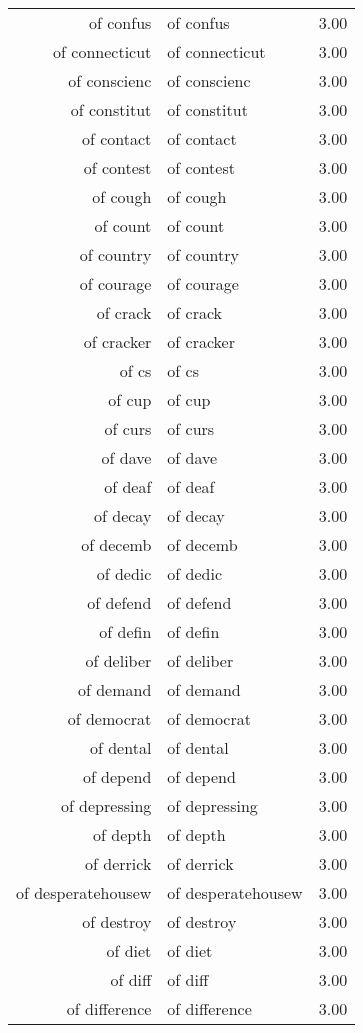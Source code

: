 \begin{table}[ht]
\begin{tabular}{rlr}
  of confus & of confus & 3.00 \\ 
  of connecticut & of connecticut & 3.00 \\ 
  of conscienc & of conscienc & 3.00 \\ 
  of constitut & of constitut & 3.00 \\ 
  of contact & of contact & 3.00 \\ 
  of contest & of contest & 3.00 \\ 
  of cough & of cough & 3.00 \\ 
  of count & of count & 3.00 \\ 
  of country & of country & 3.00 \\ 
  of courage & of courage & 3.00 \\ 
  of crack & of crack & 3.00 \\ 
  of cracker & of cracker & 3.00 \\ 
  of cs & of cs & 3.00 \\ 
  of cup & of cup & 3.00 \\ 
  of curs & of curs & 3.00 \\ 
  of dave & of dave & 3.00 \\ 
  of deaf & of deaf & 3.00 \\ 
  of decay & of decay & 3.00 \\ 
  of decemb & of decemb & 3.00 \\ 
  of dedic & of dedic & 3.00 \\ 
  of defend & of defend & 3.00 \\ 
  of defin & of defin & 3.00 \\ 
  of deliber & of deliber & 3.00 \\ 
  of demand & of demand & 3.00 \\ 
  of democrat & of democrat & 3.00 \\ 
  of dental & of dental & 3.00 \\ 
  of depend & of depend & 3.00 \\ 
  of depressing & of depressing & 3.00 \\ 
  of depth & of depth & 3.00 \\ 
  of derrick & of derrick & 3.00 \\ 
  of desperatehousew & of desperatehousew & 3.00 \\ 
  of destroy & of destroy & 3.00 \\ 
  of diet & of diet & 3.00 \\ 
  of diff & of diff & 3.00 \\ 
  of difference & of difference & 3.00 \\ 

\end{tabular}
\end{table}
